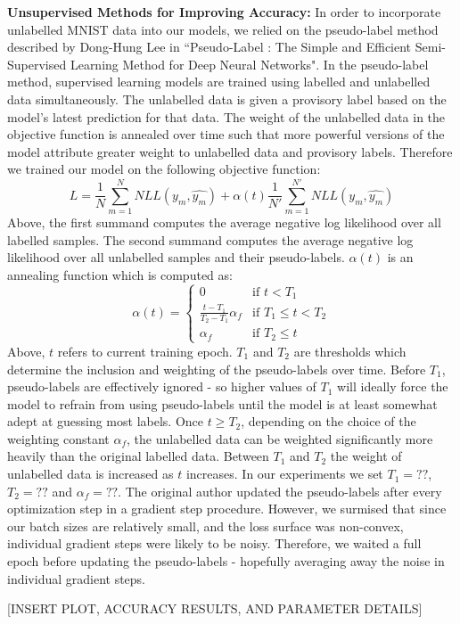\documentclass[a4paper]{article}
\begin{document}
\begin{enumerate}
{\textbf{Unsupervised Methods for Improving Accuracy:}
\newline
\newline
In order to incorporate unlabelled MNIST data into our models, we relied on the pseudo-label method described by Dong-Hung Lee in ``Pseudo-Label : The Simple and Efficient Semi-Supervised Learning Method for Deep Neural Networks". In the pseudo-label method, supervised learning models are trained using labelled and unlabelled data simultaneously. The unlabelled data is given a provisory label based on the model's latest prediction for that data. The weight of the unlabelled data in the objective function is annealed over time such that more powerful versions of the model attribute greater weight to unlabelled data and provisory labels. 
\newline
\newline
Therefore we trained our model on the following objective function:
$$L = \frac{1}{N} \sum_{m=1}^{N} NLL(y_m, \hat{y_m}) + \alpha(t) \frac{1}{N'} \sum_{m=1}^{N'} NLL(y_m, \hat{y_m}) $$
Above, the first summand computes the average negative log likelihood over all labelled samples. The second summand computes the average negative log likelihood over all unlabelled samples and their pseudo-labels. $\alpha(t)$ is an annealing function which is computed as:
\begin{equation}\alpha(t) = 
\left\{
	\begin{array}{ll}
		0 & \mbox{if } t <T_1\\
		\frac{t-T_1}{T_2-T_1} \alpha_f & \mbox{if } T_1 \leq t < T_2 \\
		\alpha_f & \mbox{if } T_2 \leq t
	\end{array}
\right.\end{equation}
Above, $t$ refers to current training epoch. $T_1$ and $T_2$ are thresholds which determine the inclusion and weighting of the pseudo-labels over time. Before $T_1$, pseudo-labels are effectively ignored - so higher values of $T_1$ will ideally force the model to refrain from using pseudo-labels until the model is at least somewhat adept at guessing most labels. Once $t \geq T_2$, depending on the choice of the weighting constant $\alpha_f$, the unlabelled data can be weighted significantly more heavily than the original labelled data. Between $T_1$ and $T_2$ the weight of unlabelled data is increased as $t$ increases. 
\newline
\newline
In our experiments we set $T_1 = ??$, $T_2 = ??$ and $\alpha_f = ??$. The original author updated the pseudo-labels after every optimization step in a gradient step procedure. However, we surmised that since our batch sizes are relatively small, and the loss surface was non-convex, individual gradient steps were likely to be noisy. Therefore, we waited a full epoch before updating the pseudo-labels - hopefully averaging away the noise in individual gradient steps. 
\newline
\newline

[INSERT PLOT, ACCURACY RESULTS, AND PARAMETER DETAILS]
}
\end{enumerate}
\end{document}
